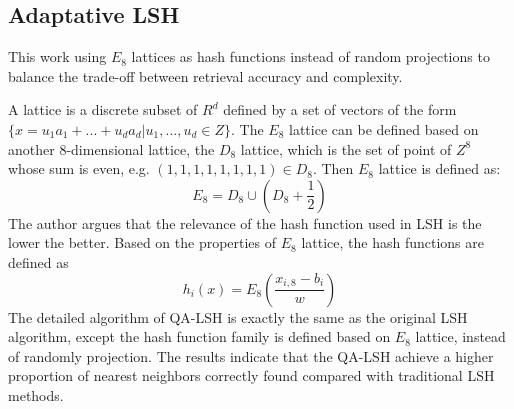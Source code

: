 \subsection{Adaptative LSH}
This work \cite{jegou2008query} using $E_8$ lattices as hash functions instead of random projections to balance the trade-off between retrieval accuracy and complexity.

A lattice is a discrete subset of $R^d$ defined by a set of vectors of the form $\{x=u_1a_1+...+u_da_d|u_1, ..., u_d\in Z\}$. The $E_8$ lattice can be defined based on another 8-dimensional lattice, the $D_8$ lattice, which is the set of point of $Z^8$ whose sum is even, e.g. $(1,1,1,1,1,1,1,1)\in D_8$. Then $E_8$ lattice is defined as:
$$E_8=D_8\cup (D_8+\frac{1}{2})$$
The author argues that the relevance of the hash function used in LSH is the lower the better. Based on the properties of $E_8$ lattice, the hash functions are defined as $$h_i(x)=E_8(\frac{x_{i,8}-b_i}{w})$$ The detailed algorithm of QA-LSH is exactly the same as the original LSH algorithm, except the hash function family is defined based on $E_8$ lattice, instead of randomly projection. The results indicate that the QA-LSH achieve a higher proportion of nearest neighbors correctly found compared with traditional LSH methods. 
